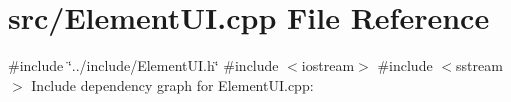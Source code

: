 \section{src/\-Element\-U\-I.cpp \-File \-Reference}
\label{_element_u_i_8cpp}
{\ttfamily \#include \char`\"{}../include/\-Element\-U\-I.\-h\char`\"{}}\*
{\ttfamily \#include $<$iostream$>$}\*
{\ttfamily \#include $<$sstream$>$}\*
\-Include dependency graph for \-Element\-U\-I.\-cpp\-:
